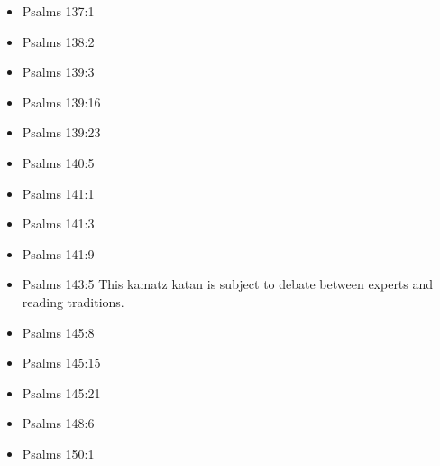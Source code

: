 \documentclass[14pt]{book}
\begin{document}
\begin{multicols}{2}
\begin{itemize}
							\item Psalms 137:1
							
							\item Psalms 138:2
							
							\item Psalms 139:3
							
							\item Psalms 139:16
							
							\item Psalms 139:23
							
							\item Psalms 140:5
							
							\item Psalms 141:1
							
							\item Psalms 141:3
							
							\item Psalms 141:9
							
							\item Psalms 143:5 This kamatz katan is subject to debate between experts and reading traditions.
							
							\item Psalms 145:8
							
							\item Psalms 145:15
							
							\item Psalms 145:21
							
							\item Psalms 148:6
							
							\item Psalms 150:1
									
							\end{itemize}\end{multicols}
						
\end{document}
